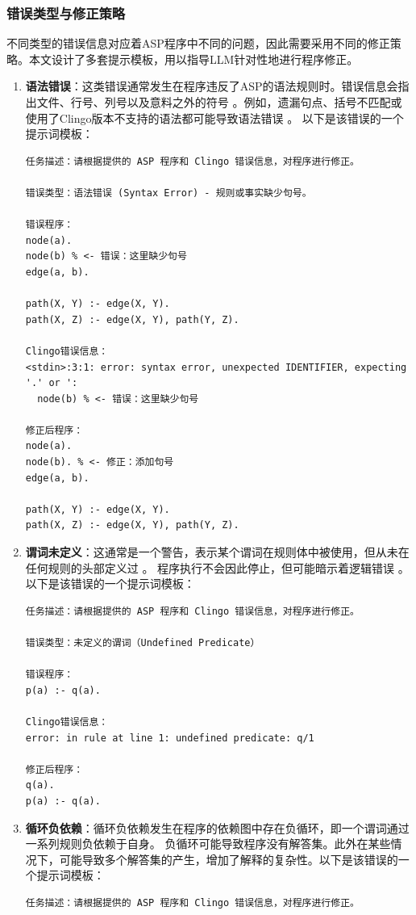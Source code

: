 \subsubsection{错误类型与修正策略}
不同类型的错误信息对应着ASP程序中不同的问题，因此需要采用不同的修正策略。本文设计了多套提示模板，用以指导LLM针对性地进行程序修正。
\begin{enumerate}[nosep]
\item \textbf{语法错误}：这类错误通常发生在程序违反了ASP的语法规则时。错误信息会指出文件、行号、列号以及意料之外的符号 。例如，遗漏句点、括号不匹配或使用了Clingo版本不支持的语法都可能导致语法错误 。
以下是该错误的一个提示词模板：
\begin{lstlisting}
任务描述：请根据提供的 ASP 程序和 Clingo 错误信息，对程序进行修正。

错误类型：语法错误 (Syntax Error) - 规则或事实缺少句号。

错误程序：
node(a).
node(b) % <- 错误：这里缺少句号
edge(a, b).

path(X, Y) :- edge(X, Y).
path(X, Z) :- edge(X, Y), path(Y, Z).

Clingo错误信息：
<stdin>:3:1: error: syntax error, unexpected IDENTIFIER, expecting '.' or ':
  node(b) % <- 错误：这里缺少句号

修正后程序：
node(a).
node(b). % <- 修正：添加句号
edge(a, b).

path(X, Y) :- edge(X, Y).
path(X, Z) :- edge(X, Y), path(Y, Z).
\end{lstlisting}
\item \textbf{谓词未定义}：这通常是一个警告，表示某个谓词在规则体中被使用，但从未在任何规则的头部定义过 。
程序执行不会因此停止，但可能暗示着逻辑错误 。以下是该错误的一个提示词模板：
\begin{lstlisting}
任务描述：请根据提供的 ASP 程序和 Clingo 错误信息，对程序进行修正。

错误类型：未定义的谓词（Undefined Predicate）

错误程序：
p(a) :- q(a).

Clingo错误信息：
error: in rule at line 1: undefined predicate: q/1

修正后程序：
q(a).
p(a) :- q(a).
\end{lstlisting}
\item \textbf{循环负依赖}：循环负依赖发生在程序的依赖图中存在负循环，即一个谓词通过一系列规则负依赖于自身。
负循环可能导致程序没有解答集。​此外在某些情况下，可能导致多个解答集的产生，增加了解释的复杂性。以下是该错误的一个提示词模板：
\begin{lstlisting}
任务描述：请根据提供的 ASP 程序和 Clingo 错误信息，对程序进行修正。


\end{lstlisting}
\end{enumerate}
